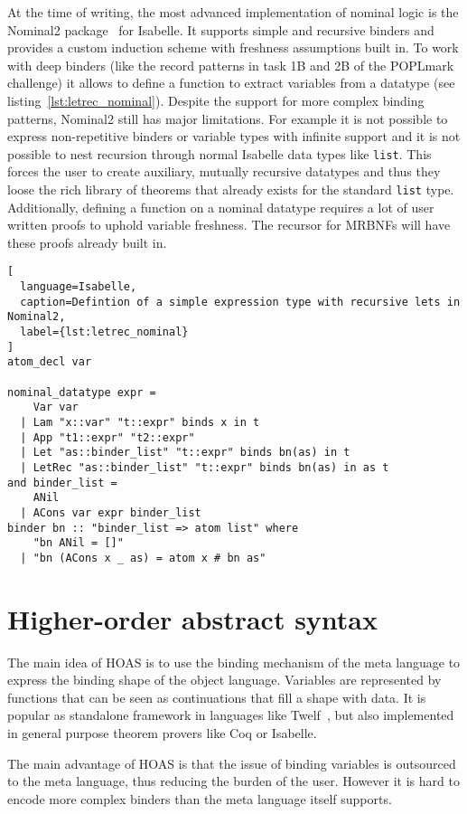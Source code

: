 At the time of writing, the most advanced implementation of nominal logic is the Nominal2 package~\cite{nominal2} for Isabelle. It supports simple and recursive binders and provides a custom induction scheme with freshness assumptions built in. To work with deep binders (like the record patterns in task 1B and 2B of the POPLmark challenge) it allows to define a function to extract variables from a datatype (see listing~\ref{lst:letrec_nominal}). Despite the support for more complex binding patterns, Nominal2 still has major limitations. For example it is not possible to express non-repetitive binders or variable types with infinite support and it is not possible to nest recursion through normal Isabelle data types like \texttt{list}. This forces the user to create auxiliary, mutually recursive datatypes and thus they loose the rich library of theorems that already exists for the standard \texttt{list} type. Additionally, defining a function on a nominal datatype requires a lot of user written proofs to uphold variable freshness. The recursor for \acp{MRBNF} will have these proofs already built in.

\begin{lstlisting}[
  language=Isabelle,
  caption=Defintion of a simple expression type with recursive lets in Nominal2,
  label={lst:letrec_nominal}
]
atom_decl var

nominal_datatype expr =
    Var var
  | Lam "x::var" "t::expr" binds x in t
  | App "t1::expr" "t2::expr"
  | Let "as::binder_list" "t::expr" binds bn(as) in t
  | LetRec "as::binder_list" "t::expr" binds bn(as) in as t
and binder_list =
    ANil
  | ACons var expr binder_list
binder bn :: "binder_list => atom list" where
    "bn ANil = []"
  | "bn (ACons x _ as) = atom x # bn as"
\end{lstlisting}

\section{Higher-order abstract syntax}

The main idea of \ac{HOAS} is to use the binding mechanism of the meta language to express the binding shape of the object language. Variables are represented by functions that can be seen as continuations that fill a shape with data. It is popular as standalone framework in languages like Twelf~\cite{twelf}, but also implemented in general purpose theorem provers like Coq or Isabelle.

The main advantage of \ac{HOAS} is that the issue of binding variables is outsourced to the meta language, thus reducing the burden of the user. However it is hard to encode more complex binders than the meta language itself supports.
